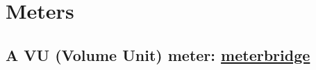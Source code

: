 





\chapter{Meters}

\section{A VU (Volume Unit) meter: \href{http://plugin.org.uk/meterbridge/}{meterbridge}}

